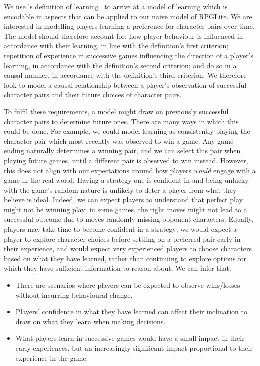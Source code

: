 We use \citeauthor{de2013learning}'s definition of
learning~\cite{de2013learning} to arrive at a model of learning which is
encodable in aspects that can be applied to our naive model of RPGLite. We are
interested in modelling players learning a preference for character pairs over
time. The model should therefore account for: how player behaviour is influenced
in accordance with their learning, in line with the definition's first
criterion; repetition of experience in successive games influencing the
direction of a player's learning, in accordance with the definition's second
criterion; and do so in a causal manner, in accordance with the definition's
third criterion. We therefore look to model a causal relationship between a
player's observation of successful character pairs and their future choices of
character pairs.

To fulfil these requirements, a model might draw on previously successful
character pairs to determine future ones. There are many ways in which this
could be done. For example, we could model learning as consistently playing the
character pair which most recently was observed to win a game. Any game ending
naturally determines a winning pair, and we can select this pair when playing
future games, until a different pair is observed to win instead. However, this
does not align with our expectations around how players \emph{would} engage with
a game in the real world. Having a strategy one is confident in and being
unlucky with the game's random nature is unlikely to deter a player from what
they believe is ideal. Indeed, we can expect players to understand
that perfect play might not be winning play: in some games, the right moves
might not lead to a successful outcome due to moves randomly missing opponent
characters. Equally, players may take time to become confident in a strategy; we
would expect a player to explore character choices before settling on a
preferred pair early in their experience, and would expect very experienced
players to choose characters based on what they have learned, rather than
continuing to explore options for which they have sufficient information to
reason about. We can infer that:

\begin{itemize}
  \item There are scenarios where players can be expected to observe wins/losses
  without incurring behavioural change.
  \item Players' confidence in what they have learned can affect their
  inclination to draw on what they learn when making decisions.
  \item What players learn in successive games would have a small impact in
  their early experiences, but an increasingly significant impact proportional
  to their experience in the game.
\end{itemize}

